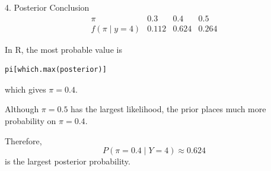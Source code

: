 \documentclass[12pt]{beamer}
\begin{document}
{\begin{frame}[fragile]{}
\begin{block}{4. Posterior Conclusion}
\[
\begin{array}{c|ccc}
\pi & 0.3 & 0.4 & 0.5 \\ \hline
f(\pi\mid y=4)
& 0.112 & 0.624 & 0.264
\end{array}
\]

In R, the most probable value is
\begin{verbatim}
pi[which.max(posterior)]
\end{verbatim}
which gives $\pi=0.4.$

\vspace{0.1cm}
Although $\pi=0.5$ has the largest likelihood, the prior places much
more probability on $\pi=0.4$.

Therefore,
\[
P(\pi=0.4\mid Y=4)\approx 0.624
\]
is the largest posterior probability.
\end{block}
\end{frame}
}
\end{document}
